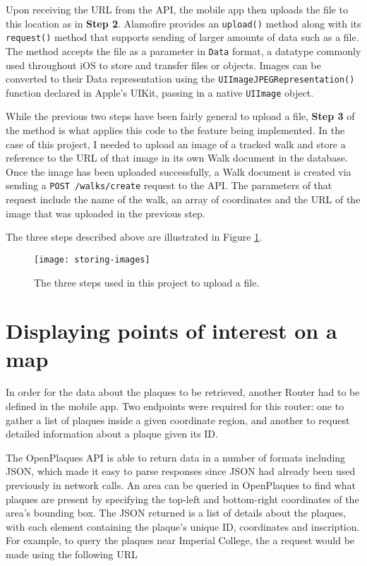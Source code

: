 Upon receiving the URL from the API, the mobile app then uploads the file to this location as in \textbf{Step 2}. Alamofire provides an \texttt{upload()} method along with its \texttt{request()} method that supports sending of larger amounts of data such as a file. The method accepts the file as a parameter in \texttt{Data} format, a datatype commonly used throughout iOS to store and transfer files or objects. Images can be converted to their Data representation using the \texttt{UIImageJPEGRepresentation()} function declared in Apple's UIKit, passing in a native \texttt{UIImage} object.

While the previous two steps have been fairly general to upload a file, \textbf{Step 3} of the method is what applies this code to the feature being implemented. In the case of this project, I needed to upload an image of a tracked walk and store a reference to the URL of that image in its own Walk document in the database. Once the image has been uploaded successfully, a Walk document is created via sending a \texttt{POST /walks/create} request to the API. The parameters of that request include the name of the walk, an array of coordinates and the URL of the image that was uploaded in the previous step.

The three steps described above are illustrated in Figure \ref{fig:storing-images}.

\begin{figure}[hbt]
  \centering
  \texttt{[image: storing-images]}
  \caption{The three steps used in this project to upload a file.}
  \label{fig:storing-images}
\end{figure}

\section{Displaying points of interest on a map}

In order for the data about the plaques to be retrieved, another Router had to be defined in the mobile app. Two endpoints were required for this router: one to gather a list of plaques inside a given coordinate region, and another to request detailed information about a plaque given its ID.

The OpenPlaques API is able to return data in a number of formats including JSON, which made it easy to parse responses since JSON had already been used previously in network calls. An area can be queried in OpenPlaques to find what plaques are present by specifying the top-left and bottom-right coordinates of the area's bounding box. The JSON returned is a list of details about the plaques, with each element containing the plaque's unique ID, coordinates and inscription. For example, to query the plaques near Imperial College, the a request would be made using the following URL

